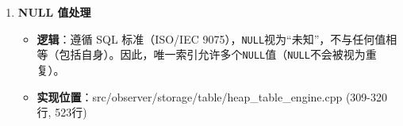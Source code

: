 \documentclass[a4paper, 12pt]{article}
\begin{document}
\begin{enumerate}
\begin{itemize}
\begin{lstlisting}[language=C++]
    // 2. 构建新复合键
    int total_key_length = 0;
    for (const FieldMeta* field : index->index_meta().fields()) {
        total_key_length += field->len();
    }
    char* key_buffer = new char[total_key_length];
    int offset = 0;
    for (const FieldMeta* field : index->index_meta().fields()) {
        const char* field_data = new_record.data() + field->offset();
        memcpy(key_buffer + offset, field_data, field->len());
        offset += field->len();
    }

    // 3. 查询索引是否存在相同键
    std::list<RID> existing_rids;
    RC rc = index->get_entry(key_buffer, total_key_length, existing_rids);
    delete[] key_buffer;
    if (rc == RC::SUCCESS && !existing_rids.empty()) {
        // 排除当前记录自身（索引字段未变更的情况）
        bool is_self = false;
        for (const RID& rid : existing_rids) {
            if (rid == new_record.rid()) {
                is_self = true;
                break;
            }
        }
        if (!is_self) {
            return RC::RECORD_DUPLICATE_KEY; // 存在其他记录的重复键
        }
    }
}
        \end{lstlisting}
        \item \textbf{排除自身的必要性}：更新非索引字段时（如唯一索引在\texttt{id}，更新\texttt{name}），索引键未变，查询会返回当前记录自身，需排除以避免误判冲突。
    \end{itemize}

    \item \textbf{NULL 值处理}
    
\begin{itemize}
        \item \textbf{逻辑}：遵循 SQL 标准（ISO/IEC 9075），\texttt{NULL}视为“未知”，不与任何值相等（包括自身）。因此，唯一索引允许多个\texttt{NULL}值（\texttt{NULL}不会被视为重复）。
        \item \textbf{实现位置}：src/observer/storage/table/heap\_table\_engine.cpp (309-320行, 523行)
    \end{itemize}
\end{enumerate}
\end{document}
